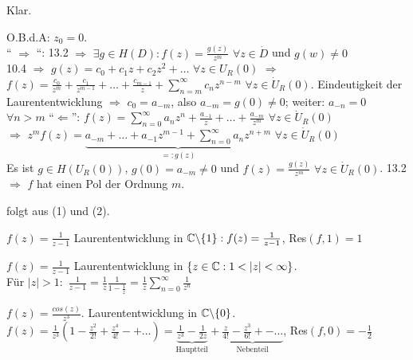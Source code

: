 \documentclass[a4paper,twoside,DIV15,BCOR12mm]{scrbook}
\begin{document}
\begin{beweis}
\begin{liste}
\item Klar.
\item O.B.d.A: $z_0 = 0$. \\
`` $\Rightarrow$ ``: 13.2 $\Rightarrow$ $\exists g \in H(D): f(z) =
\frac{g(z)}{z^m}$ $\forall z \in \dot{D}$ und $g(w) \neq 0$  \\
10.4 $\Rightarrow$ $g(z) = c_0 + c_1z + c_2 z^2 + \ldots $ $\forall z \in
U_R(0)$ $\Rightarrow$ $f(z) = \frac{c_0}{z^m}  + \frac{c_1}{z^{m-1}} + \ldots +
\frac{c_{m-1}}{z} + \sum\limits_{n=m}^{\infty} c_n z^{n-m}$ $\forall z \in
\dot{U}_R(0)$. Eindeutigkeit der Laurententwicklung $\Rightarrow$ $c_0 =
a_{-m}$, also $a_{-m} = g(0) \neq 0$; weiter: $a_{-n} = 0$ $\forall n > m$
``$\Leftarrow$'': $f(z) = \sum\limits_{n=0}^{\infty} a_n z^n + \frac{a_{-1}}{z}
+ \ldots + \frac{a_{-m}}{z^m}$ $\forall z \in \dot{U}_R(0)$ \\
$\Rightarrow$ $z^m f(z) = \underbrace{a_{-m} + \ldots + a_{-1} z ^{m-1} +
\sum\limits_{n=0}^{\infty} a_n z^{n+m}}_{ =: g(z)}$ $\forall z \in \dot{U}_R(0)$
\\
Es ist $g \in H(U_R(0))$, $g(0) = a_{-m} \neq 0$ und $f(z) = \frac{g(z)}{z^m}$
$\forall z \in \dot{U}_R(0)$. 13.2 $\Rightarrow$ $f$ hat einen Pol der Ordnung $m$.
\item folgt aus (1) und (2).
\end{liste}
\end{beweis}

\begin{beispiele}
\begin{liste}
\item $f(z) = \frac{1}{z-1}$ Laurententwicklung in $\mathbb{C} \backslash \{1\}: f(z)
= \frac{1}{z-1}$, Res$(f,1) = 1$
\item  $f(z) = \frac{1}{z-1}$ Laurententwicklung in $\{ z \in \mathbb{C} : 1 < |z| <
\infty \}$.\\ Für $|z| >
1: $ $\frac{1}{z-1} = \frac{1}{z} \frac{1}{1- \frac{1}{z}} = 
\frac{1}{z} \sum\limits_{n=0}^{\infty} \frac{1}{z^n}$
\item $f(z) = \frac{cos(z)}{z^3}.$ Laurententwicklung in $\mathbb{C} \backslash
\{0\}$. $f(z) = \frac{1}{z^3}(1 - \frac{z^2}{2!} + \frac{z^4}{4!} -+ \ldots)
= \underbrace{\frac{1}{z^3} - \frac{1}{2z}}_{\text{Hauptteil}} + \underbrace{\frac{z}{4!}-
\frac{z^3}{6!} +- \ldots}_{\text{Nebenteil}}$, Res$(f,0) = -\frac{1}{2}$
\end{liste}
\end{beispiele}
\end{document}
